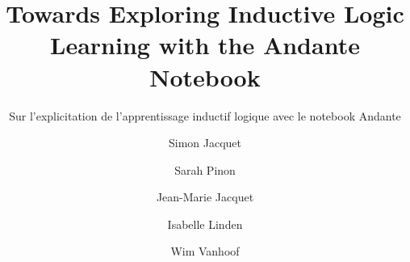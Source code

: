 \documentclass[manuscript,authordraft]{acmart}
\def\venue{IHM~'22} %
\newcommand{\en}[1]{\foreignlanguage{english}{#1}}
\newcommand{\fr}[1]{\foreignlanguage{french}{#1}}
\begin{document}
\sloppy

\def\titreFR{Sur l'explicitation de l'apprentissage inductif logique avec le notebook Andante}
\def\titreEN{Towards Exploring Inductive Logic Learning with the Andante Notebook}
\def\titreSHORT{ILP et Andante} %


\title[\en{\titreSHORT}]{\en{\titreEN}}
\subtitle{\fr{\titreFR}}


\author{Simon Jacquet}

\author{Sarah Pinon}

\author{Jean-Marie Jacquet}

\author{Isabelle Linden}

\author{Wim Vanhoof}

% 
% 
% 
\end{document}
